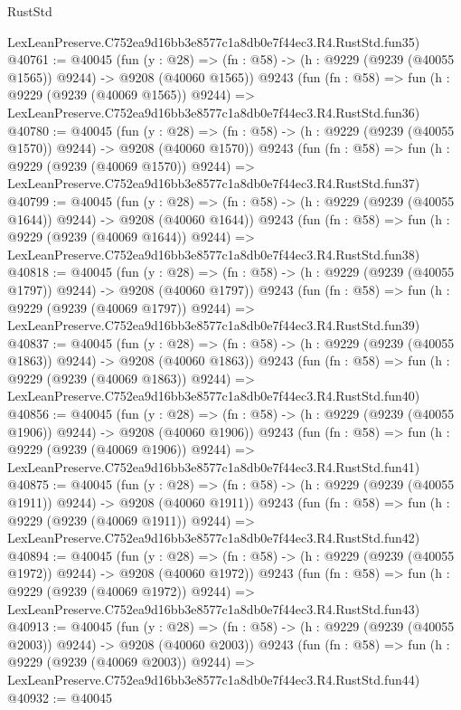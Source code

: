 \begin{lexlean}{RustStd}
\begin{coremodule}
    LexLeanPreserve.C752ea9d16bb3e8577c1a8db0e7f44ec3.R4.RustStd.fun35)
@40761 := @40045
    (fun (y : @28) =>
    (fn : @58) -> (h : @9229 (@9239 (@40055 @1565)) @9244) -> @9208 (@40060 @1565))
    @9243
    (fun (fn : @58) =>
    fun (h : @9229 (@9239 (@40069 @1565)) @9244) =>
    LexLeanPreserve.C752ea9d16bb3e8577c1a8db0e7f44ec3.R4.RustStd.fun36)
@40780 := @40045
    (fun (y : @28) =>
    (fn : @58) -> (h : @9229 (@9239 (@40055 @1570)) @9244) -> @9208 (@40060 @1570))
    @9243
    (fun (fn : @58) =>
    fun (h : @9229 (@9239 (@40069 @1570)) @9244) =>
    LexLeanPreserve.C752ea9d16bb3e8577c1a8db0e7f44ec3.R4.RustStd.fun37)
@40799 := @40045
    (fun (y : @28) =>
    (fn : @58) -> (h : @9229 (@9239 (@40055 @1644)) @9244) -> @9208 (@40060 @1644))
    @9243
    (fun (fn : @58) =>
    fun (h : @9229 (@9239 (@40069 @1644)) @9244) =>
    LexLeanPreserve.C752ea9d16bb3e8577c1a8db0e7f44ec3.R4.RustStd.fun38)
@40818 := @40045
    (fun (y : @28) =>
    (fn : @58) -> (h : @9229 (@9239 (@40055 @1797)) @9244) -> @9208 (@40060 @1797))
    @9243
    (fun (fn : @58) =>
    fun (h : @9229 (@9239 (@40069 @1797)) @9244) =>
    LexLeanPreserve.C752ea9d16bb3e8577c1a8db0e7f44ec3.R4.RustStd.fun39)
@40837 := @40045
    (fun (y : @28) =>
    (fn : @58) -> (h : @9229 (@9239 (@40055 @1863)) @9244) -> @9208 (@40060 @1863))
    @9243
    (fun (fn : @58) =>
    fun (h : @9229 (@9239 (@40069 @1863)) @9244) =>
    LexLeanPreserve.C752ea9d16bb3e8577c1a8db0e7f44ec3.R4.RustStd.fun40)
@40856 := @40045
    (fun (y : @28) =>
    (fn : @58) -> (h : @9229 (@9239 (@40055 @1906)) @9244) -> @9208 (@40060 @1906))
    @9243
    (fun (fn : @58) =>
    fun (h : @9229 (@9239 (@40069 @1906)) @9244) =>
    LexLeanPreserve.C752ea9d16bb3e8577c1a8db0e7f44ec3.R4.RustStd.fun41)
@40875 := @40045
    (fun (y : @28) =>
    (fn : @58) -> (h : @9229 (@9239 (@40055 @1911)) @9244) -> @9208 (@40060 @1911))
    @9243
    (fun (fn : @58) =>
    fun (h : @9229 (@9239 (@40069 @1911)) @9244) =>
    LexLeanPreserve.C752ea9d16bb3e8577c1a8db0e7f44ec3.R4.RustStd.fun42)
@40894 := @40045
    (fun (y : @28) =>
    (fn : @58) -> (h : @9229 (@9239 (@40055 @1972)) @9244) -> @9208 (@40060 @1972))
    @9243
    (fun (fn : @58) =>
    fun (h : @9229 (@9239 (@40069 @1972)) @9244) =>
    LexLeanPreserve.C752ea9d16bb3e8577c1a8db0e7f44ec3.R4.RustStd.fun43)
@40913 := @40045
    (fun (y : @28) =>
    (fn : @58) -> (h : @9229 (@9239 (@40055 @2003)) @9244) -> @9208 (@40060 @2003))
    @9243
    (fun (fn : @58) =>
    fun (h : @9229 (@9239 (@40069 @2003)) @9244) =>
    LexLeanPreserve.C752ea9d16bb3e8577c1a8db0e7f44ec3.R4.RustStd.fun44)
@40932 := @40045

\end{coremodule}
\end{lexlean}
